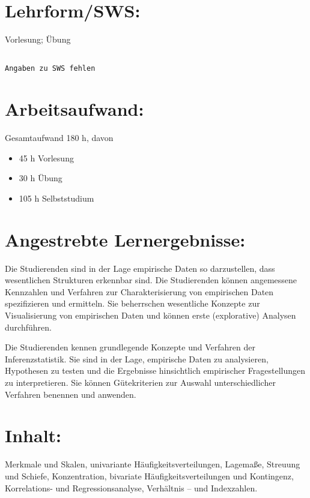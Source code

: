 \section*{Lehrform/SWS:}\label{lehrformsws-12}

Vorlesung; Übung

\begin{verbatim}

Angaben zu SWS fehlen
\end{verbatim}

\section*{Arbeitsaufwand:}\label{arbeitsaufwand-12}

Gesamtaufwand 180 h, davon

\begin{itemize}
\item
  45 h Vorlesung
\item
  30 h Übung
\item
  105 h Selbststudium
\end{itemize}

\section*{Angestrebte
Lernergebnisse:}\label{angestrebte-lernergebnisse-12}

Die Studierenden sind in der Lage empirische Daten so darzustellen, dass
wesentlichen Strukturen erkennbar sind. Die Studierenden können
angemessene Kennzahlen und Verfahren zur Charakterisierung von
empirischen Daten spezifizieren und ermitteln. Sie beherrschen
wesentliche Konzepte zur Visualisierung von empirischen Daten und können
erste (explorative) Analysen durchführen.

Die Studierenden kennen grundlegende Konzepte und Verfahren der
Inferenzstatistik. Sie sind in der Lage, empirische Daten zu
analysieren, Hypothesen zu testen und die Ergebnisse hinsichtlich
empirischer Fragestellungen zu interpretieren. Sie können Gütekriterien
zur Auswahl unterschiedlicher Verfahren benennen und anwenden.

\section*{Inhalt:}\label{inhalt-12}

Merkmale und Skalen, univariante Häufigkeitsverteilungen, Lagemaße,
Streuung und Schiefe, Konzentration, bivariate Häufigkeitsverteilungen
und Kontingenz, Korrelations- und Regressionsanalyse, Verhältnis -- und
Indexzahlen.

